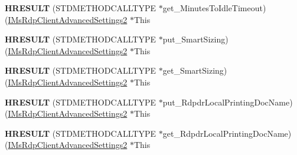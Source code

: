 \begin{DoxyCompactItemize}
\item 
\mbox{\label{struct_m_s_t_s_c_lib_1_1_i_ms_rdp_client_advanced_settings2_vtbl_a16f5d9577764021adc057e075f7a85be}} 
{\bfseries H\+R\+E\+S\+U\+LT} (S\+T\+D\+M\+E\+T\+H\+O\+D\+C\+A\+L\+L\+T\+Y\+PE $\ast$get\+\_\+\+Minutes\+To\+Idle\+Timeout)(\hyperlink{interface_m_s_t_s_c_lib_1_1_i_ms_rdp_client_advanced_settings2}{I\+Ms\+Rdp\+Client\+Advanced\+Settings2} $\ast$This
\item 
\mbox{\label{struct_m_s_t_s_c_lib_1_1_i_ms_rdp_client_advanced_settings2_vtbl_a88bcd2c762b16ae9b6dde80ec877a51c}} 
{\bfseries H\+R\+E\+S\+U\+LT} (S\+T\+D\+M\+E\+T\+H\+O\+D\+C\+A\+L\+L\+T\+Y\+PE $\ast$put\+\_\+\+Smart\+Sizing)(\hyperlink{interface_m_s_t_s_c_lib_1_1_i_ms_rdp_client_advanced_settings2}{I\+Ms\+Rdp\+Client\+Advanced\+Settings2} $\ast$This
\item 
\mbox{\label{struct_m_s_t_s_c_lib_1_1_i_ms_rdp_client_advanced_settings2_vtbl_a007b39c6178e2fc8448a7e16649c6e82}} 
{\bfseries H\+R\+E\+S\+U\+LT} (S\+T\+D\+M\+E\+T\+H\+O\+D\+C\+A\+L\+L\+T\+Y\+PE $\ast$get\+\_\+\+Smart\+Sizing)(\hyperlink{interface_m_s_t_s_c_lib_1_1_i_ms_rdp_client_advanced_settings2}{I\+Ms\+Rdp\+Client\+Advanced\+Settings2} $\ast$This
\item 
\mbox{\label{struct_m_s_t_s_c_lib_1_1_i_ms_rdp_client_advanced_settings2_vtbl_a766abe413e7295a2fbfd0110ce883096}} 
{\bfseries H\+R\+E\+S\+U\+LT} (S\+T\+D\+M\+E\+T\+H\+O\+D\+C\+A\+L\+L\+T\+Y\+PE $\ast$put\+\_\+\+Rdpdr\+Local\+Printing\+Doc\+Name)(\hyperlink{interface_m_s_t_s_c_lib_1_1_i_ms_rdp_client_advanced_settings2}{I\+Ms\+Rdp\+Client\+Advanced\+Settings2} $\ast$This
\item 
\mbox{\label{struct_m_s_t_s_c_lib_1_1_i_ms_rdp_client_advanced_settings2_vtbl_a28db8efa1946bc939f45a059ab8e01c3}} 
{\bfseries H\+R\+E\+S\+U\+LT} (S\+T\+D\+M\+E\+T\+H\+O\+D\+C\+A\+L\+L\+T\+Y\+PE $\ast$get\+\_\+\+Rdpdr\+Local\+Printing\+Doc\+Name)(\hyperlink{interface_m_s_t_s_c_lib_1_1_i_ms_rdp_client_advanced_settings2}{I\+Ms\+Rdp\+Client\+Advanced\+Settings2} $\ast$This

\end{DoxyCompactItemize}
